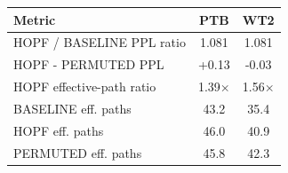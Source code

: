 \begin{tabular}{lcc}
\toprule
Metric & PTB & WT2 \\
\midrule
HOPF / BASELINE PPL ratio & 1.081 & 1.081 \\
HOPF - PERMUTED PPL & +0.13 & -0.03 \\
HOPF effective-path ratio & 1.39$\times$ & 1.56$\times$ \\
BASELINE eff. paths & 43.2 & 35.4 \\
HOPF eff. paths & 46.0 & 40.9 \\
PERMUTED eff. paths & 45.8 & 42.3 \\
\bottomrule
\end{tabular}
